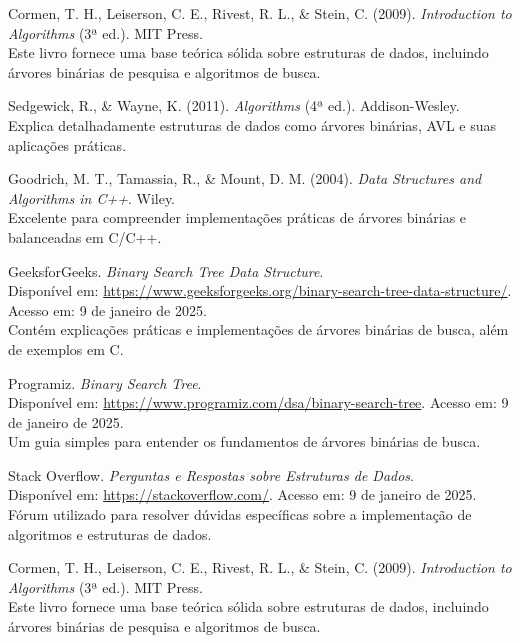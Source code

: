 \documentclass[a4paper, 12pt, english]{article}
\begin{document}
\begin{thebibliography}{9}

Cormen, T. H., Leiserson, C. E., Rivest, R. L., \& Stein, C. (2009). 
\textit{Introduction to Algorithms} (3ª ed.). MIT Press. 
\\
Este livro fornece uma base teórica sólida sobre estruturas de dados, incluindo árvores binárias de pesquisa e algoritmos de busca.

Sedgewick, R., \& Wayne, K. (2011). 
\textit{Algorithms} (4ª ed.). Addison-Wesley. 
\\
Explica detalhadamente estruturas de dados como árvores binárias, AVL e suas aplicações práticas.

Goodrich, M. T., Tamassia, R., \& Mount, D. M. (2004). 
\textit{Data Structures and Algorithms in C++}. Wiley. 
\\
Excelente para compreender implementações práticas de árvores binárias e balanceadas em C/C++.

GeeksforGeeks. \textit{Binary Search Tree Data Structure}.
\\
Disponível em: \url{https://www.geeksforgeeks.org/binary-search-tree-data-structure/}. Acesso em: 9 de janeiro de 2025. 
\\
Contém explicações práticas e implementações de árvores binárias de busca, além de exemplos em C.

Programiz. \textit{Binary Search Tree}.
\\
Disponível em: \url{https://www.programiz.com/dsa/binary-search-tree}. Acesso em: 9 de janeiro de 2025.
\\
Um guia simples para entender os fundamentos de árvores binárias de busca.

Stack Overflow. \textit{Perguntas e Respostas sobre Estruturas de Dados}.
\\
Disponível em: \url{https://stackoverflow.com/}. Acesso em: 9 de janeiro de 2025.
\\
Fórum utilizado para resolver dúvidas específicas sobre a implementação de algoritmos e estruturas de dados.

Cormen, T. H., Leiserson, C. E., Rivest, R. L., \& Stein, C. (2009). 
\textit{Introduction to Algorithms} (3ª ed.). MIT Press. 
\\
Este livro fornece uma base teórica sólida sobre estruturas de dados, incluindo árvores binárias de pesquisa e algoritmos de busca.


\end{thebibliography}
\end{document}
